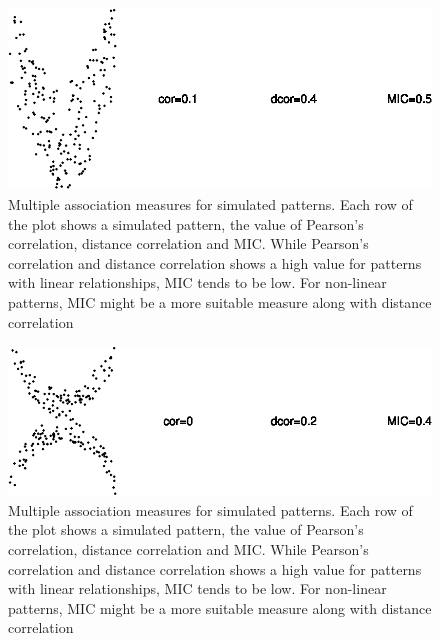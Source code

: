 \begin{Schunk}
\begin{figure}
{\centering \includegraphics{rj_paper_files/figure-latex/motivation1-6} 

}

\caption[Multiple association measures for simulated patterns]{Multiple association measures for simulated patterns. Each row of the plot shows a simulated pattern, the value of Pearson's correlation, distance correlation and MIC. While Pearson's correlation and distance correlation shows a high value for patterns with linear relationships, MIC tends to be low. For non-linear patterns, MIC might be a more suitable measure along with distance correlation}\label{fig:motivation1-6}
\end{figure}
\begin{figure}

{\centering \includegraphics{rj_paper_files/figure-latex/motivation1-7} 

}

\caption[Multiple association measures for simulated patterns]{Multiple association measures for simulated patterns. Each row of the plot shows a simulated pattern, the value of Pearson's correlation, distance correlation and MIC. While Pearson's correlation and distance correlation shows a high value for patterns with linear relationships, MIC tends to be low. For non-linear patterns, MIC might be a more suitable measure along with distance correlation}\label{fig:motivation1-7}
\end{figure}
\begin{figure}


\end{figure}
\end{Schunk}
